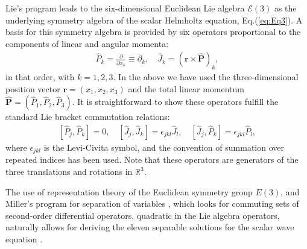 \documentclass[12pt]{iopart}
\begin{document}
Lie's program leads to the six-dimensional Euclidean Lie algebra $\mathcal{E}(3)$ as the underlying symmetry algebra of the scalar Helmholtz equation, Eq.(\ref{eq:Eq3}).
A basis for this symmetry algebra is provided by six operators proportional to the components of linear and angular momenta:
\begin{eqnarray}
\hat{P}_{k} = \frac{\partial}{\partial x_{k}} \equiv \partial_{k}, \quad
\hat{J}_{k} = \left( \bm{r} \times \hat{\bm{P}} \right)_{k},
\end{eqnarray}
in that order, with $k=1,2,3$. In the above we have used the three-dimensional position vector $\bm{r} = (x_{1},x_{2},x_{3})$ and the total linear momentum $\hat{\bm{P} }= (\hat{P}_{1},\hat{P}_{2},\hat{P}_{3})$.
It is straightforward to show these operators fulfill the standard Lie bracket commutation relations:
\begin{eqnarray}
\left[ \hat{P}_{j}, \hat{P}_{k} \right] = 0, \quad \left[ \hat{J}_{j}, \hat{J}_{k} \right] = \epsilon_{jkl} \hat{J}_{l}, \quad \left[ \hat{J}_{j}, \hat{P}_{k} \right] = \epsilon_{jkl} \hat{P}_{l},
\end{eqnarray}
where $\epsilon_{jkl}$ is the Levi-Civita symbol, and the convention of summation over repeated indices has been used. Note that these operators
are generators of the three translations and rotations in $\mathbb{R}^3$.

The use of representation theory of the Euclidean symmetry group $E(3)$, and Miller's program for separation of variables \cite{Miller1975}, which looks for commuting sets of second-order differential operators, quadratic in the Lie algebra operators, naturally allows for deriving the eleven separable solutions for the scalar wave equation \cite{Boyer1976p35,Miller1984}.
\end{document}
